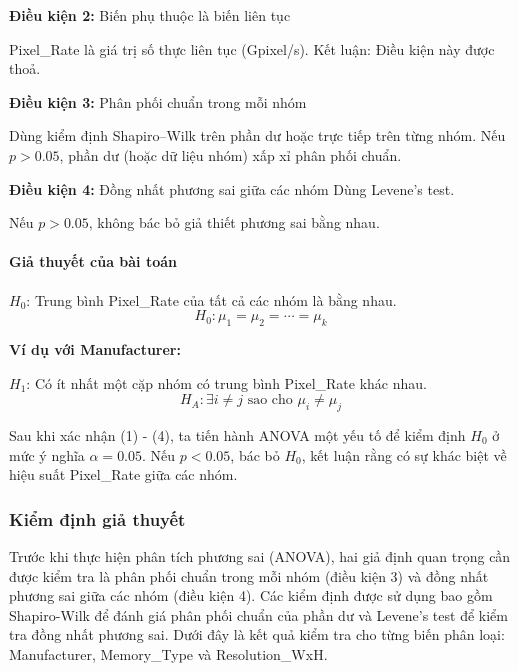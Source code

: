 \textbf{Điều kiện 2:} Biến phụ thuộc là biến liên tục

Pixel\_Rate là giá trị số thực liên tục (Gpixel/s).
Kết luận: Điều kiện này được thoả.

\textbf{Điều kiện 3:} Phân phối chuẩn trong mỗi nhóm

Dùng kiểm định Shapiro–Wilk trên phần dư hoặc trực tiếp trên từng nhóm.
Nếu $p>0.05$, phần dư (hoặc dữ liệu nhóm) xấp xỉ phân phối chuẩn.

\textbf{Điều kiện 4:} Đồng nhất phương sai giữa các nhóm
Dùng Levene's test.

Nếu $p>0.05$, không bác bỏ giả thiết phương sai bằng nhau.

\paragraph{Giả thuyết của bài toán}
$H_0$: Trung bình Pixel\_Rate của tất cả các nhóm là bằng nhau.
$$H_0: \mu_1 = \mu_2 = \cdots = \mu_k$$

\textbf{Ví dụ với Manufacturer:}

$H_1$: Có ít nhất một cặp nhóm có trung bình Pixel\_Rate khác nhau.
$$H_A: \exists i \neq j \text{ sao cho } \mu_i \neq \mu_j
$$

Sau khi xác nhận (1) - (4), ta tiến hành ANOVA một yếu tố để kiểm định $H_0$ ở mức ý nghĩa $\alpha=0.05$. Nếu $p < 0.05$, bác bỏ $H_0$, kết luận rằng có sự khác biệt về hiệu suất Pixel\_Rate giữa các nhóm.

\subsubsection{Kiểm định giả thuyết}
Trước khi thực hiện phân tích phương sai (ANOVA), hai giả định quan trọng cần được kiểm tra là phân phối chuẩn trong mỗi nhóm (điều kiện 3) và đồng nhất phương sai giữa các nhóm (điều kiện 4). Các kiểm định được sử dụng bao gồm Shapiro-Wilk để đánh giá phân phối chuẩn của phần dư và Levene's test để kiểm tra đồng nhất phương sai. Dưới đây là kết quả kiểm tra cho từng biến phân loại: Manufacturer, Memory\_Type và Resolution\_WxH.

